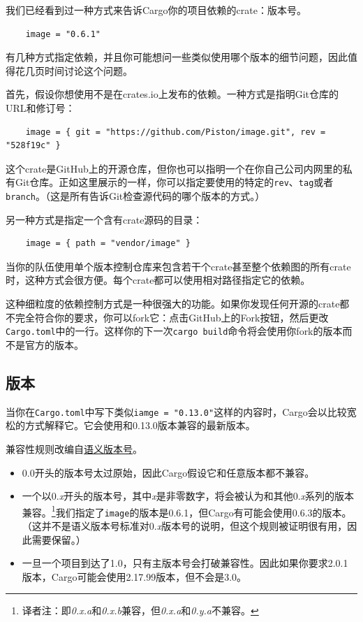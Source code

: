 我们已经看到过一种方式来告诉Cargo你的项目依赖的crate：版本号。
\begin{verbatim}
    image = "0.6.1"
\end{verbatim}

有几种方式指定依赖，并且你可能想问一些类似使用哪个版本的细节问题，因此值得花几页时间讨论这个问题。

首先，假设你想使用不是在crates.io上发布的依赖。一种方式是指明Git仓库的URL和修订号：
\begin{verbatim}
    image = { git = "https://github.com/Piston/image.git", rev = "528f19c" }
\end{verbatim}

这个crate是GitHub上的开源仓库，但你也可以指明一个在你自己公司内网里的私有Git仓库。正如这里展示的一样，你可以指定要使用的特定的\texttt{rev}、\texttt{tag}或者\texttt{branch}。（这是所有告诉Git检查源代码的哪个版本的方式。）

另一种方式是指定一个含有crate源码的目录：
\begin{verbatim}
    image = { path = "vendor/image" }
\end{verbatim}

当你的队伍使用单个版本控制仓库来包含若干个crate甚至整个依赖图的所有crate时，这种方式会很方便。每个crate都可以使用相对路径指定它的依赖。

这种细粒度的依赖控制方式是一种很强大的功能。如果你发现任何开源的crate都不完全符合你的要求，你可以fork它：点击GitHub上的Fork按钮，然后更改\texttt{Cargo.toml}中的一行。这样你的下一次\texttt{cargo build}命令将会使用你fork的版本而不是官方的版本。

\subsection{版本}
当你在\texttt{Cargo.toml}中写下类似\texttt{iamge = "0.13.0"}这样的内容时，Cargo会以比较宽松的方式解释它。它会使用和0.13.0版本兼容的最新版本。

兼容性规则改编自\href{https://semver.org/}{语义版本号}。

\begin{itemize}
    \item 0.0开头的版本号太过原始，因此Cargo假设它和任意版本都不兼容。
    \item 一个以0.\emph{x}开头的版本号，其中\emph{x}是非零数字，将会被认为和其他0.\emph{x}系列的版本兼容。\footnote{译者注：即\emph{0.x.a}和\emph{0.x.b}兼容，但\emph{0.x.a}和\emph{0.y.a}不兼容。}我们指定了\texttt{image}的版本是0.6.1，但Cargo有可能会使用0.6.3的版本。（这并不是语义版本号标准对0.\emph{x}版本号的说明，但这个规则被证明很有用，因此需要保留。）
    \item 一旦一个项目到达了1.0，只有主版本号会打破兼容性。因此如果你要求2.0.1版本，Cargo可能会使用2.17.99版本，但不会是3.0。
\end{itemize}

